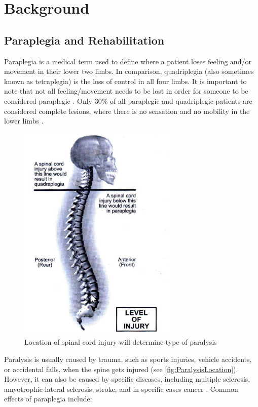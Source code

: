 \chapter{Background}

\section{Paraplegia and Rehabilitation}
Paraplegia is a medical term used to define where a patient loses feeling and/or movement in their lower two limbs. In comparison, quadriplegia (also sometimes known as tetraplegia) is the loss of control in all four limbs. It is important to note that not all feeling/movement needs to be lost in order for someone to be considered paraplegic \cite{IncompleteTraumaticQuadrilegia}. Only 30\% of all paraplegic and quadriplegic patients are considered complete lesions, where there is no sensation and no mobility in the lower limbs \cite{RehabParaplegia}. 

\begin{figure} [ht!]
    \centering
    \includegraphics[width=0.5\linewidth]{Figures/Background/ParaQuadInjuryLocs.png}
    \caption{Location of spinal cord injury will determine type of paralysis \cite{RehabParaplegia}}
    \label{fig:ParalysisLocation}
\end{figure}

Paralysis is usually caused by trauma, such as sports injuries, vehicle accidents, or accidental falls, when the spine gets injured (see \autoref{fig:ParalysisLocation}). However, it can also be caused by specific diseases, including multiple sclerosis, amyotrophic lateral sclerosis, stroke, and in specific cases cancer \cite{CausesParaplegia}. Common effects of paraplegia include:
 
